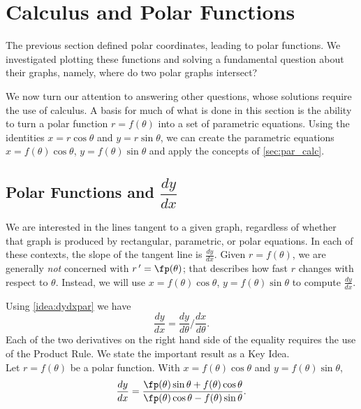 \section{Calculus and Polar Functions} \label{sec:polarcalc}

The previous section defined polar coordinates, leading to polar functions. We investigated plotting these functions and solving a fundamental question about their graphs, namely, where do two polar graphs intersect?

We now turn our attention to answering other questions, whose solutions require the use of calculus. A basis for much of what is done in this section is the ability to turn a polar function $r=f(\theta)$ into a set of parametric equations. Using the identities $x=r\cos \theta$ and $y=r\sin \theta$, we can create the parametric equations $x=f(\theta)\cos\theta$, $y=f(\theta)\sin\theta$ and apply the concepts of \autoref{sec:par_calc}.

\subsection*{Polar Functions and $\dfrac{dy}{dx}$}

We are interested in the lines tangent to a given graph, regardless of whether that graph is produced by rectangular, parametric, or polar equations. In each of these contexts, the slope of the tangent line is $\frac{dy}{dx}$. Given $r=f(\theta)$, we are generally \textit{not} concerned with $r\,'=\fp(\theta)$; that describes how fast $r$ changes with respect to $\theta$. Instead, we will use $x=f(\theta)\cos\theta$, $y=f(\theta)\sin\theta$ to compute $\frac{dy}{dx}$. 

Using \autoref{idea:dydxpar} we have $$\frac{dy}{dx} = \frac{dy}{d\theta}\Big/\frac{dx}{d\theta}.$$ Each of the two derivatives on the right hand side of the equality requires the use of the Product Rule. We state the important result as a Key Idea.\\

{Let $r=f(\theta)$ be a polar function. With $x=f(\theta)\cos\theta$ and $y=f(\theta)\sin\theta$,
$$\frac{dy}{dx} = \frac{\fp(\theta)\sin\theta+f(\theta)\cos\theta}{\fp(\theta)\cos\theta-f(\theta)\sin\theta}.$$
}


